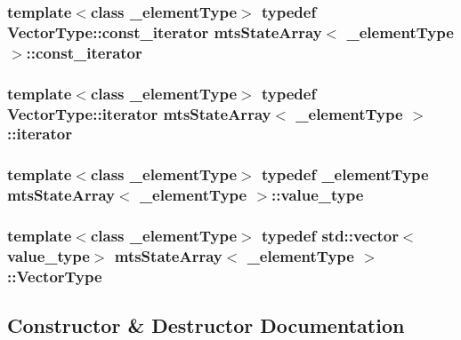 \subsubsection[{const\+\_\+iterator}]{\setlength{\rightskip}{0pt plus 5cm}template$<$class \+\_\+element\+Type$>$ typedef Vector\+Type\+::const\+\_\+iterator {\bf mts\+State\+Array}$<$ \+\_\+element\+Type $>$\+::{\bf const\+\_\+iterator}}\label{classmts_state_array_a40a7371d5f45f10e9cd9308cccef0168}
\hypertarget{classmts_state_array_ab2a822354bffa12e2d954b4a11847e98}{}
\subsubsection[{iterator}]{\setlength{\rightskip}{0pt plus 5cm}template$<$class \+\_\+element\+Type$>$ typedef Vector\+Type\+::iterator {\bf mts\+State\+Array}$<$ \+\_\+element\+Type $>$\+::{\bf iterator}}\label{classmts_state_array_ab2a822354bffa12e2d954b4a11847e98}
\hypertarget{classmts_state_array_a1d78f1e353af8687797d4a359b694ee1}{}
\subsubsection[{value\+\_\+type}]{\setlength{\rightskip}{0pt plus 5cm}template$<$class \+\_\+element\+Type$>$ typedef \+\_\+element\+Type {\bf mts\+State\+Array}$<$ \+\_\+element\+Type $>$\+::{\bf value\+\_\+type}}\label{classmts_state_array_a1d78f1e353af8687797d4a359b694ee1}
\hypertarget{classmts_state_array_a4d8a41652bc6d14fb99d28c71286058a}{}
\subsubsection[{Vector\+Type}]{\setlength{\rightskip}{0pt plus 5cm}template$<$class \+\_\+element\+Type$>$ typedef std\+::vector$<${\bf value\+\_\+type}$>$ {\bf mts\+State\+Array}$<$ \+\_\+element\+Type $>$\+::{\bf Vector\+Type}}\label{classmts_state_array_a4d8a41652bc6d14fb99d28c71286058a}


\subsection{Constructor \& Destructor Documentation}
\hypertarget{classmts_state_array_a3100d37141bac1c739cf79fb761b28e8}{}
